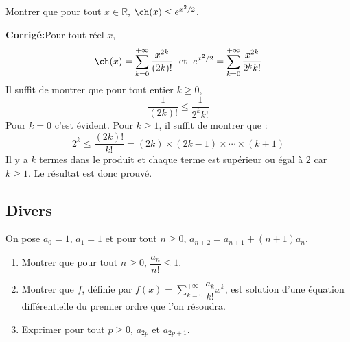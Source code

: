 \documentclass[a4paper,twoside,french,11pt]{VcCours}
\newcommand{\corr}{\textbf{Corrigé:}}
\begin{document}
\begin{Exercice}{} Montrer que pour tout $x \in \mathbb{R}$, $\ch(x) \leq e^{x^2/2}$.
\end{Exercice}

\corr Pour tout réel $x$,
$$ \ch(x) = \sum_{k=0}^{+ \infty} \dfrac{x^{2k}}{(2k)!} \; \hbox{ et } \; e^{x^2/2} = \sum_{k=0}^{+ \infty} \dfrac{x^{2k}}{2^k k!}$$
Il suffit de montrer que pour tout entier $k \geq 0$,
$$ \dfrac{1}{(2k)!} \leq \dfrac{1}{2^k	k!}$$
Pour $k=0$ c'est évident. Pour $k \geq 1$, il suffit de montrer que :
$$ 2^k \leq \dfrac{(2k)!}{k!} = (2k) \times (2k-1) \times \cdots \times (k+1)$$
Il y a $k$ termes dans le produit et chaque terme est supérieur ou égal à $2$ car $k \geq 1$. Le résultat est donc prouvé.


\subsection{Divers}



\begin{Exercice}{} On pose $a_0=1$, $a_1=1$ et pour tout $n \geq 0$, $a_{n+2} = a_{n+1} + (n+1)a_n$.
\begin{enumerate}
\item Montrer que pour tout $n \geq 0$, $\dfrac{a_n}{n!} \leq 1$.
\item Montrer que $f$, définie par $f(x) = \sum_{k=0}^{+ \infty} \dfrac{a_k}{k!}x^k$, est solution d'une équation différentielle du premier ordre que l'on résoudra.
\item Exprimer pour tout $p \geq 0$, $a_{2p}$ et $a_{2p+1}$.
\end{enumerate}
\end{Exercice}
\end{document}
